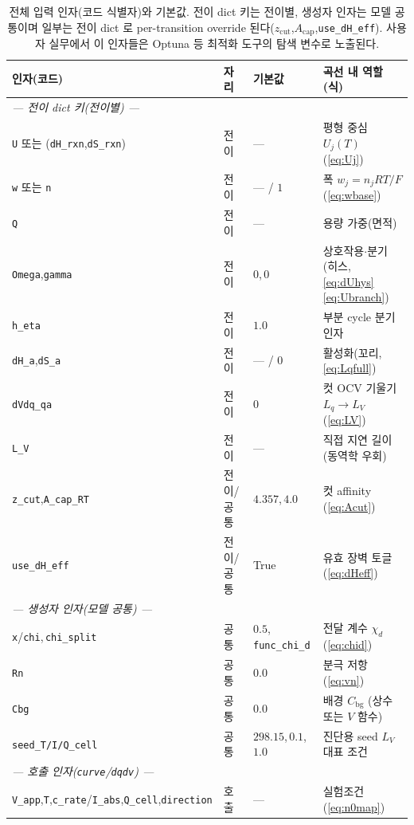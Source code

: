 \documentclass[11pt,a4paper]{article}
\newcommand{\bg}{\mathrm{bg}}
\newcommand{\code}[1]{\texttt{#1}}
\begin{document}
\begin{table}[htbp]
\centering\footnotesize
\renewcommand{\arraystretch}{1.18}
\caption{전체 입력 인자(코드 식별자)와 기본값. 전이 dict 키는 전이별, 생성자 인자는 모델 공통이며 일부는 전이 dict 로
per-transition override 된다($z_\mathrm{cut}$,$A_\mathrm{cap}$,\code{use\_dH\_eff}). 사용자 실무에서 이 인자들은
Optuna 등 최적화 도구의 탐색 변수로 노출된다.}
\label{tab:inputs}
\begin{tabular}{l l l l}
\toprule
인자(코드) & 자리 & 기본값 & 곡선 내 역할(식) \\
\midrule
\multicolumn{4}{l}{\emph{— 전이 dict 키(전이별) —}}\\
\code{U} 또는 (\code{dH\_rxn},\code{dS\_rxn}) & 전이 & --- & 평형 중심 $U_j(T)$ (\eqref{eq:Uj}) \\
\code{w} 또는 \code{n} & 전이 & --- / $1$ & 폭 $w_j=n_jRT/F$ (\eqref{eq:wbase}) \\
\code{Q} & 전이 & --- & 용량 가중(면적) \\
\code{Omega},\code{gamma} & 전이 & $0$,\,$0$ & 상호작용$\cdot$분기(히스, \eqref{eq:dUhys}\eqref{eq:Ubranch}) \\
\code{h\_eta} & 전이 & $1.0$ & 부분 cycle 분기 인자 \\
\code{dH\_a},\code{dS\_a} & 전이 & --- / $0$ & 활성화(꼬리, \eqref{eq:Lqfull}) \\
\code{dVdq\_qa} & 전이 & $0$ & 컷 OCV 기울기 $L_q\!\to\!L_V$ (\eqref{eq:LV}) \\
\code{L\_V} & 전이 & --- & 직접 지연 길이(동역학 우회) \\
\code{z\_cut},\code{A\_cap\_RT} & 전이/공통 & $4.357$,\,$4.0$ & 컷 affinity (\eqref{eq:Acut}) \\
\code{use\_dH\_eff} & 전이/공통 & True & 유효 장벽 토글(\eqref{eq:dHeff}) \\
\multicolumn{4}{l}{\emph{— 생성자 인자(모델 공통) —}}\\
\code{x}/\code{chi},\,\code{chi\_split} & 공통 & $0.5$,\,\code{func\_chi\_d} & 전달 계수 $\chi_d$ (\eqref{eq:chid}) \\
\code{Rn} & 공통 & $0.0$ & 분극 저항 (\eqref{eq:vn}) \\
\code{Cbg} & 공통 & $0.0$ & 배경 $C_\bg$ (상수 또는 $V$ 함수) \\
\code{seed\_T/I/Q\_cell} & 공통 & $298.15$,\,$0.1$,\,$1.0$ & 진단용 seed $L_V$ 대표 조건 \\
\multicolumn{4}{l}{\emph{— 호출 인자(\code{curve}/\code{dqdv}) —}}\\
\code{V\_app},\code{T},\code{c\_rate}/\code{I\_abs},\code{Q\_cell},\code{direction} & 호출 & --- & 실험조건 (\eqref{eq:n0map}) \\

\end{tabular}
\end{table}
\end{document}

